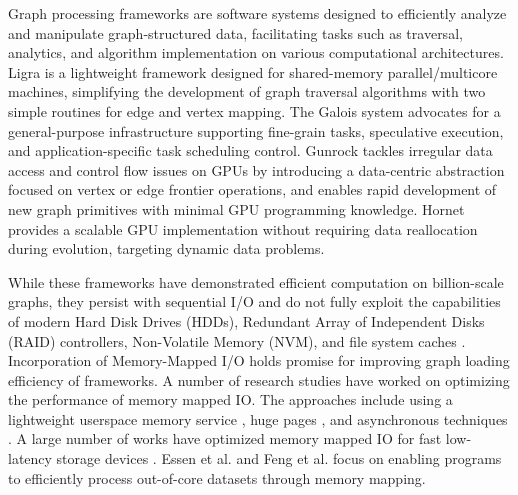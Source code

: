 Graph processing frameworks are software systems designed to efficiently analyze and manipulate graph-structured data, facilitating tasks such as traversal, analytics, and algorithm implementation on various computational architectures. Ligra \cite{shun2013ligra} is a lightweight framework designed for shared-memory parallel/multicore machines, simplifying the development of graph traversal algorithms with two simple routines for edge and vertex mapping. The Galois system \cite{nguyen2013lightweight} advocates for a general-purpose infrastructure supporting fine-grain tasks, speculative execution, and application-specific task scheduling control. Gunrock \cite{wang2016gunrock} tackles irregular data access and control flow issues on GPUs by introducing a data-centric abstraction focused on vertex or edge frontier operations, and enables rapid development of new graph primitives with minimal GPU programming knowledge. Hornet \cite{busato2018hornet} provides a scalable GPU implementation without requiring data reallocation during evolution, targeting dynamic data problems.

While these frameworks have demonstrated efficient computation on billion-scale graphs, they persist with sequential I/O and do not fully exploit the capabilities of modern Hard Disk Drives (HDDs), Redundant Array of Independent Disks (RAID) controllers, Non-Volatile Memory (NVM), and file system caches \cite{gabert2021pigo}. Incorporation of Memory-Mapped I/O holds promise for improving graph loading efficiency of frameworks. A number of research studies have worked on optimizing the performance of memory mapped IO. The approaches include using a lightweight userspace memory service \cite{li2019userland}, huge pages \cite{malliotakis2021hugemap}, and asynchronous techniques \cite{imamura2019poster}. A large number of works have optimized memory mapped IO for fast low-latency storage devices \cite{song2012low, song2016efficient, papagiannis2020optimizing, papagiannis2021memory, alverti2022daxvm, leis2023virtual}. Essen et al. \cite{van2015di} and Feng et al. \cite{feng2023tricache} focus on enabling programs to efficiently process out-of-core datasets through memory mapping.

